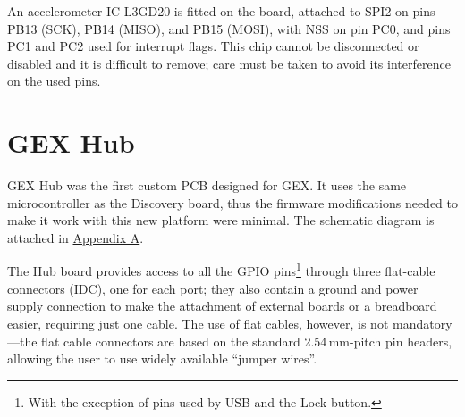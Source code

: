 An accelerometer \gls{IC} L3GD20 is fitted on the board, attached to SPI2 on pins PB13 (\gls{SCK}), PB14 (\gls{MISO}), and PB15 (\gls{MOSI}), with \gls{NSS} on pin PC0, and pins PC1 and PC2 used for interrupt flags. This chip cannot be disconnected or disabled and it is difficult to remove; care must be taken to avoid its interference on the used pins.

\section{GEX Hub}

GEX Hub was the first custom \gls{PCB} designed for GEX. It uses the same microcontroller as the Discovery board, thus the firmware modifications needed to make it work with this new platform were minimal. The schematic diagram is attached in \hyperref[apx:gex_hub]{Appendix A}.

The Hub board provides access to all the \gls{GPIO} pins\footnote{With the exception of pins used by USB and the Lock button.} through three flat-cable connectors (IDC), one for each port; they also contain a ground and power supply connection to make the attachment of external boards or a breadboard easier, requiring just one cable. The use of flat cables, however, is not mandatory---the flat cable connectors are based on the standard 2.54\,mm-pitch pin headers, allowing the user to use widely available ``jumper wires''.

